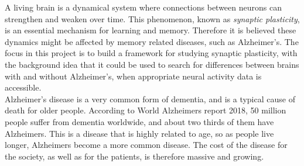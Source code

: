 


A living brain is a dynamical system where connections between neurons can strengthen and weaken over time. This phenomenon, known as \textit{synaptic plasticity}, is an essential mechanism for learning and memory. Therefore it is believed these dynamics might be affected by memory related diseases, such as Alzheimer's. The focus in this project is to build a framework for studying synaptic plasticity, with the background idea that it could be used to search for differences between brains with and without Alzheimer's, when appropriate neural activity data is accessible.  \\

Alzheimer's disease is a very common form of dementia, and is a typical cause of death for older people. According to World Alzheimers report 2018, 50 million people suffer from dementia worldwide, and about two thirds of them have Alzheimers. This is a disease that is highly related to age, so as people live longer, Alzheimers become a more common disease. The cost of the disease for the society, as well as for the patients, is therefore massive and growing.

